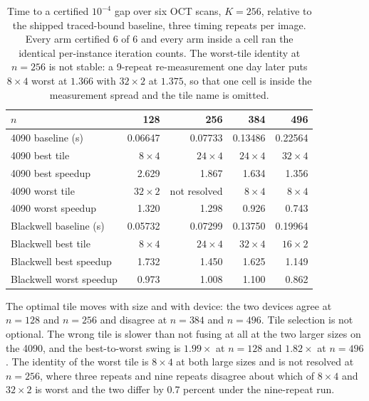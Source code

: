 \begin{table}[t]
\centering
\caption{Time to a certified $10^{-4}$ gap over six OCT scans, $K=256$,
relative to the shipped traced-bound baseline, three timing repeats per image.
Every arm certified 6 of 6 and every arm inside a cell ran the identical
per-instance iteration counts. The worst-tile identity at $n=256$ is not
stable: a 9-repeat re-measurement one day later puts $8\times4$ worst at
$1.366$ with $32\times2$ at $1.375$, so that one cell is inside the measurement
spread and the tile name is omitted.}
\label{tab:fusion}
\begin{tabular}{@{}lrrrr@{}}
\toprule
$n$ & 128 & 256 & 384 & 496 \\
\midrule
4090 baseline (s)  & 0.06647 & 0.07733 & 0.13486 & 0.22564 \\
4090 best tile     & $8\times4$ & $24\times4$ & $24\times4$ & $32\times4$ \\
4090 best speedup  & 2.629 & 1.867 & 1.634 & 1.356 \\
4090 worst tile    & $32\times2$ & not resolved & $8\times4$ & $8\times4$ \\
4090 worst speedup & 1.320 & 1.298 & 0.926 & 0.743 \\
\midrule
Blackwell baseline (s) & 0.05732 & 0.07299 & 0.13750 & 0.19964 \\
Blackwell best tile    & $8\times4$ & $24\times4$ & $32\times4$ & $16\times2$ \\
Blackwell best speedup & 1.732 & 1.450 & 1.625 & 1.149 \\
Blackwell worst speedup & 0.973 & 1.008 & 1.100 & 0.862 \\
\bottomrule
\end{tabular}
\end{table}

The optimal tile moves with size and with device: the two devices agree at
$n=128$ and $n=256$ and disagree at $n=384$ and $n=496$. Tile selection is not
optional. The wrong tile is slower than not fusing at all at the two larger
sizes on the 4090, and the best-to-worst swing is $1.99\times$ at $n=128$ and
$1.82\times$ at $n=496$. The identity of the worst tile is $8\times4$ at both
large sizes and is not resolved at $n=256$, where three repeats and nine
repeats disagree about which of $8\times4$ and $32\times2$ is worst and the two
differ by 0.7 percent under the nine-repeat run.

